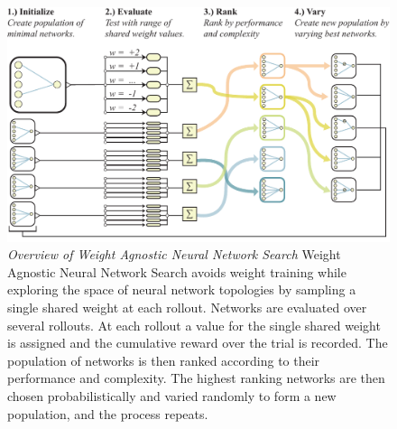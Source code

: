 
\begin{figure}[th!]
\vskip -0.05in %
    \centering        
    \includegraphics[width=1\textwidth]{img/wann.pdf}   
\vskip -0.05in %
    \caption      
    {     
        \textit{Overview of Weight Agnostic Neural Network Search}
        \newline
        Weight Agnostic Neural Network Search avoids weight training while exploring the space of neural network topologies by sampling a single shared weight at each rollout. 
        Networks are evaluated over several rollouts. At each rollout a value for the single shared weight is assigned and the cumulative reward over the trial is recorded. 
        The population of networks is then ranked according to their performance and complexity. 
        The highest ranking networks are then chosen probabilistically and varied randomly to form a new population, and the process repeats.
    }         
    \label{fig:overview}
\vskip -0.15in %
\end{figure}

